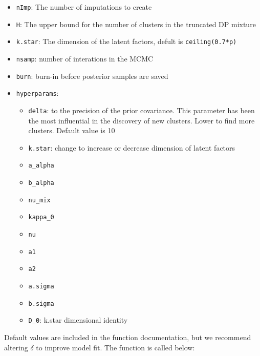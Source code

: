\documentclass[
]{article}
\providecommand{\tightlist}{%
  \setlength{\itemsep}{0pt}\setlength{\parskip}{0pt}}
\begin{document}
\begin{itemize}
\tightlist
\item
  \texttt{nImp}: The number of imputations to create
\item
  \texttt{H}: The upper bound for the number of clusters in the
  truncated DP mixture
\item
  \texttt{k.star}: The dimension of the latent factors, defult is
  \texttt{ceiling(0.7*p)}
\item
  \texttt{nsamp}: number of interations in the MCMC
\item
  \texttt{burn}: burn-in before posterior samples are saved
\item
  \texttt{hyperparams}:

  \begin{itemize}
  \tightlist
  \item
    \texttt{delta}: to the precision of the prior covariance. This
    parameter has been the most influential in the discovery of new
    clusters. Lower to find more clusters. Default value is 10
  \item
    \texttt{k.star}: change to increase or decrease dimension of latent
    factors
  \item
    \texttt{a\_alpha}
  \item
    \texttt{b\_alpha}
  \item
    \texttt{nu\_mix}
  \item
    \texttt{kappa\_0}
  \item
    \texttt{nu}
  \item
    \texttt{a1}
  \item
    \texttt{a2}
  \item
    \texttt{a.sigma}
  \item
    \texttt{b.sigma}
  \item
    \texttt{D\_0}: k.star dimensional identity
  \end{itemize}
\end{itemize}

Default values are included in the function documentation, but we
recommend altering \(\delta\) to improve model fit. The function is
called below:
\end{document}
